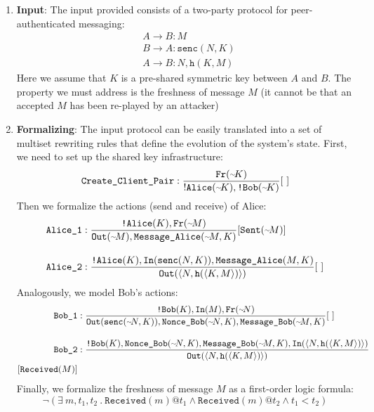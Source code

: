 \begin{enumerate}
    \item \textbf{Input}: The input provided consists of a two-party protocol for peer-authenticated messaging:
        \begin{align*}
            &A \to B: M\\
            &B \to A: \texttt{senc}(N, K)\\
            &A \to B: N, \texttt{h}(K,M)
        \end{align*}
        Here we assume that $K$ is a pre-shared symmetric key between $A$ and $B$. The property we must address is the freshness of message $M$ (it cannot be that an accepted $M$ has been re-played by an attacker)

    \item \textbf{Formalizing}: The input protocol can be easily translated into a set of multiset rewriting rules that define the evolution of the system's state. First, we need to set up the shared key infrastructure:
        \begin{equation*}
            \texttt{Create\_Client\_Pair}: \frac{\texttt{Fr}(\fr K)}{!\texttt{Alice}(\fr K), \texttt{!Bob}(\fr K)}[ \ ]
        \end{equation*}
        Then we formalize the actions (send and receive) of Alice:
        \begin{align*}
            \texttt{Alice\_1} &: \frac{\texttt{!Alice}(K), \texttt{Fr}(\fr M)} {\texttt{Out}(\fr M), \texttt{Message\_Alice}(\fr M, K)} [ \texttt{Sent}(\fr M) ] \\[1em]
            \texttt{Alice\_2} &: \frac{\texttt{!Alice}(K), \texttt{In}(\texttt{senc}(N, K)), \texttt{Message\_Alice}(M,K)} {\texttt{Out}(\langle N, \texttt{h}(\langle K, M \rangle)\rangle)} [ \ ]
        \end{align*}
        Analogously, we model Bob's actions:
        \begin{align*}
            \texttt{Bob\_1} &: \frac{\texttt{!Bob}(K), \texttt{In}(M), \texttt{Fr}(\fr N)} {\texttt{Out}(\texttt{senc}(\fr N, K)), \texttt{Nonce\_Bob}(\fr N, K), \texttt{Message\_Bob}(\fr M, K)} [ \ ] \\[1em]
            \texttt{Bob\_2} &: \frac{\texttt{!Bob}(K), \texttt{Nonce\_Bob}(\fr N, K), \texttt{Message\_Bob}(\fr M, K), \texttt{In}(\langle N, \texttt{h}(\langle K, M\rangle)\rangle)} {\texttt{Out}(\langle N, \texttt{h}(\langle K, M \rangle)\rangle)} \\ [ \texttt{Received}(M) ]
        \end{align*}
        Finally, we formalize the freshness of message $M$ as a first-order logic formula:
        \begin{equation*}
            \neg \left( \exists \  m, t_1, t_2 \ . \ \texttt{Received}(m) @ t_1 \land \texttt{Received}(m) @ t_2 \land t_1 < t_2 \right)
        \end{equation*}


\end{enumerate}
